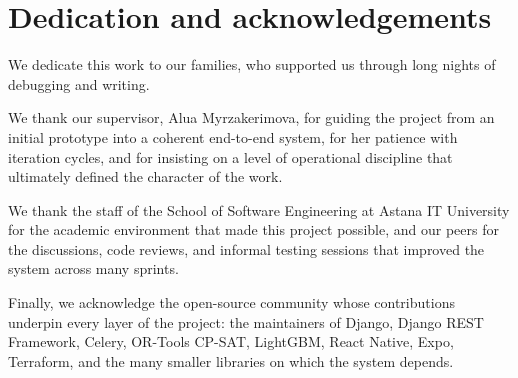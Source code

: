 %
%
\chapter{Dedication and acknowledgements}
\begin{SingleSpace}

We dedicate this work to our families, who supported us through long nights of debugging and writing.

We thank our supervisor, Alua Myrzakerimova, for guiding the project from an initial prototype into a coherent end-to-end system, for her patience with iteration cycles, and for insisting on a level of operational discipline that ultimately defined the character of the work.

We thank the staff of the School of Software Engineering at Astana IT University for the academic environment that made this project possible, and our peers for the discussions, code reviews, and informal testing sessions that improved the system across many sprints.

Finally, we acknowledge the open-source community whose contributions underpin every layer of the project: the maintainers of Django, Django REST Framework, Celery, OR-Tools CP-SAT, LightGBM, React Native, Expo, Terraform, and the many smaller libraries on which the system depends.

\end{SingleSpace}
\clearpage
